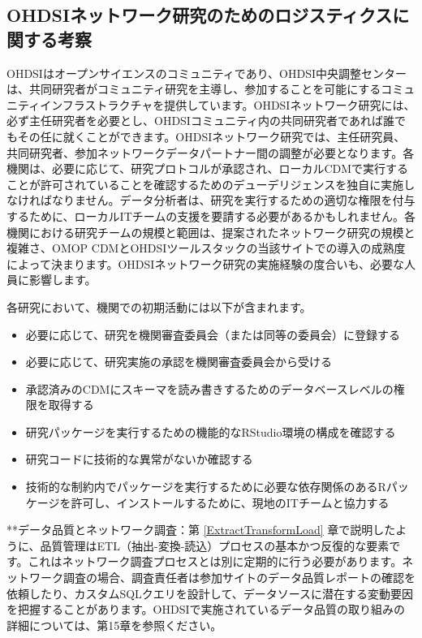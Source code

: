 \documentclass[
  11pt]{book}
\makeatletter
\newenvironment{kframe}{%
\medskip{}
\setlength{\fboxsep}{.8em}
 \def\at@end@of@kframe{}%
 \ifinner\ifhmode%
  \def\at@end@of@kframe{\end{minipage}}%
  \begin{minipage}{\columnwidth}%
 \fi\fi%
 \def\FrameCommand##1{\hskip\@totalleftmargin \hskip-\fboxsep
 \colorbox{myShadeColor}{##1}\hskip-\fboxsep
     \hskip-\linewidth \hskip-\@totalleftmargin \hskip\columnwidth}%
 \MakeFramed {\advance\hsize-\width
   \@totalleftmargin\z@ \linewidth\hsize
   \@setminipage}}%
 {\par\unskip\endMakeFramed%
 \at@end@of@kframe}
\newenvironment{rmdblock}[1]
  {
  \begin{itemize}
  \renewcommand{\labelitemi}{
    \raisebox{-.7\height}[0pt][0pt]{
      {\setkeys{Gin}{width=3em,keepaspectratio}\texttt{[image: images/\#1]}}
    }
  }
  \setlength{\fboxsep}{1em}
  \begin{kframe}
  \item
  }
  {
  \end{kframe}
  \end{itemize}
  }
\newenvironment{rmdimportant}
  {\begin{rmdblock}{important}}
  {\end{rmdblock}}
\theoremstyle{definition}
\theoremstyle{definition}
\theoremstyle{definition}
\theoremstyle{definition}
\theoremstyle{remark}
\makeatother
\begin{document}
\subsection{OHDSIネットワーク研究のためのロジスティクスに関する考察}\label{ohdsiux30cdux30c3ux30c8ux30efux30fcux30afux7814ux7a76ux306eux305fux3081ux306eux30edux30b8ux30b9ux30c6ux30a3ux30afux30b9ux306bux95a2ux3059ux308bux8003ux5bdf}

 OHDSIはオープンサイエンスのコミュニティであり、OHDSI中央調整センターは、共同研究者がコミュニティ研究を主導し、参加することを可能にするコミュニティインフラストラクチャを提供しています。OHDSIネットワーク研究には、必ず主任研究者を必要とし、OHDSIコミュニティ内の共同研究者であれば誰でもその任に就くことができます。OHDSIネットワーク研究では、主任研究員、共同研究者、参加ネットワークデータパートナー間の調整が必要となります。各機関は、必要に応じて、研究プロトコルが承認され、ローカルCDMで実行することが許可されていることを確認するためのデューデリジェンスを独自に実施しなければなりません。データ分析者は、研究を実行するための適切な権限を付与するために、ローカルITチームの支援を要請する必要があるかもしれません。各機関における研究チームの規模と範囲は、提案されたネットワーク研究の規模と複雑さ、OMOP CDMとOHDSIツールスタックの当該サイトでの導入の成熟度によって決まります。OHDSIネットワーク研究の実施経験の度合いも、必要な人員に影響します。

各研究において、機関での初期活動には以下が含まれます。

\begin{itemize}
\item
  必要に応じて、研究を機関審査委員会（または同等の委員会）に登録する
\item
  必要に応じて、研究実施の承認を機関審査委員会から受ける
\item
  承認済みのCDMにスキーマを読み書きするためのデータベースレベルの権限を取得する
\item
  研究パッケージを実行するための機能的なRStudio環境の構成を確認する
\item
  研究コードに技術的な異常がないか確認する
\item
  技術的な制約内でパッケージを実行するために必要な依存関係のあるRパッケージを許可し、インストールするために、現地のITチームと協力する
\end{itemize}

\begin{rmdimportant}
**データ品質とネットワーク調査：第 \ref{ExtractTransformLoad} 章で説明したように、品質管理はETL（抽出-変換-読込）プロセスの基本かつ反復的な要素です。これはネットワーク調査プロセスとは別に定期的に行う必要があります。ネットワーク調査の場合、調査責任者は参加サイトのデータ品質レポートの確認を依頼したり、カスタムSQLクエリを設計して、データソースに潜在する変動要因を把握することがあります。OHDSIで実施されているデータ品質の取り組みの詳細については、第15章を参照ください。
\end{rmdimportant}
\end{document}
